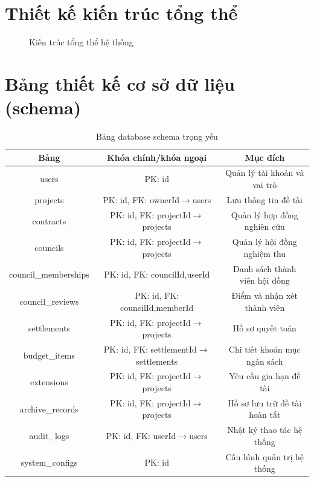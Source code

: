 \documentclass[12pt,a4paper]{report}
\begin{document}
\section{Thiết kế kiến trúc tổng thể}
\begin{figure}[H]
\centering
{}
\caption{Kiến trúc tổng thể hệ thống}
\end{figure}

\section{Bảng thiết kế cơ sở dữ liệu (schema)}
\begin{table}[H]
\centering
\begin{tabular}{|c|c|c|}
\hline
\textbf{Bảng} & \textbf{Khóa chính/khóa ngoại} & \textbf{Mục đích} \\ \hline
users & PK: id & Quản lý tài khoản và vai trò \\ \hline
projects & PK: id, FK: ownerId$\rightarrow$users & Lưu thông tin đề tài \\ \hline
contracts & PK: id, FK: projectId$\rightarrow$projects & Quản lý hợp đồng nghiên cứu \\ \hline
councils & PK: id, FK: projectId$\rightarrow$projects & Quản lý hội đồng nghiệm thu \\ \hline
council\_memberships & PK: id, FK: councilId,userId & Danh sách thành viên hội đồng \\ \hline
council\_reviews & PK: id, FK: councilId,memberId & Điểm và nhận xét thành viên \\ \hline
settlements & PK: id, FK: projectId$\rightarrow$projects & Hồ sơ quyết toán \\ \hline
budget\_items & PK: id, FK: settlementId$\rightarrow$settlements & Chi tiết khoản mục ngân sách \\ \hline
extensions & PK: id, FK: projectId$\rightarrow$projects & Yêu cầu gia hạn đề tài \\ \hline
archive\_records & PK: id, FK: projectId$\rightarrow$projects & Hồ sơ lưu trữ đề tài hoàn tất \\ \hline
audit\_logs & PK: id, FK: userId$\rightarrow$users & Nhật ký thao tác hệ thống \\ \hline
system\_configs & PK: id & Cấu hình quản trị hệ thống \\ \hline
\end{tabular}
\caption{Bảng database schema trọng yếu}
\end{table}
\end{document}
